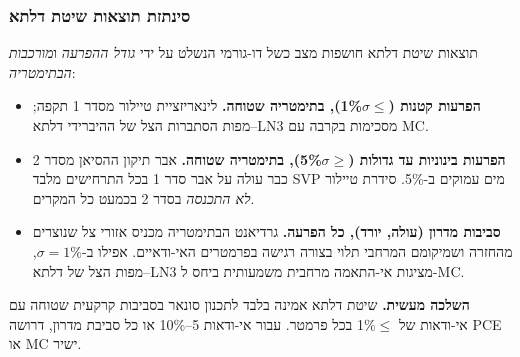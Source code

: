 \documentclass[12pt,a4paper]{article}
\DeclareRobustCommand{\aiedit}[1]{\textcolor{blue}{#1}}
\begin{document}
\subsubsection{סינתזת תוצאות שיטת דלתא}

תוצאות שיטת דלתא חושפות מצב כשל דו-גורמי הנשלט על ידי
\emph{גודל ההפרעה} ו\emph{מורכבות הבתימטריה}:

\begin{itemize}
  \item \textbf{הפרעות קטנות ($\sigma\leq$1\%{}), בתימטריה שטוחה.}
        לינאריזציית טיילור מסדר 1 תקפה; מפות הסתברות הצל של ההיברידי
        דלתא--\textenglish{LN3} מסכימות בקרבה עם MC.

  \item \textbf{הפרעות בינוניות עד גדולות ($\sigma\geq$5\%{}), בתימטריה שטוחה.}
        אבר תיקון ההסיאן מסדר 2 כבר עולה על אבר סדר 1 בכל התרחישים
        מלבד SVP מים עמוקים ב-5\%{}.
        סידרת טיילור \emph{לא התכנסה} בסדר 2 בכמעט כל המקרים.

  \item \textbf{סביבות מדרון (עולה, יורד), כל הפרעה.}
        גרדיאנט הבתימטריה מכניס אזורי צל שנוצרים מהחזרה
        ושמיקומם המרחבי תלוי בצורה רגישה בפרמטרים האי-ודאיים.
        אפילו ב-$\sigma=1\%$, מפות הצל של דלתא--\textenglish{LN3} מציגות
        אי-התאמה מרחבית משמעותית ביחס ל-MC.
\end{itemize}

\textbf{השלכה מעשית.} שיטת דלתא אמינה בלבד לתכנון סונאר בסביבות קרקעית שטוחה
עם אי-ודאות של $\leq$1\%{} בכל פרמטר.
עבור אי-ודאות 5--10\%{} או כל סביבת מדרון, דרושה \textenglish{PCE} או MC ישיר.
\end{document}
